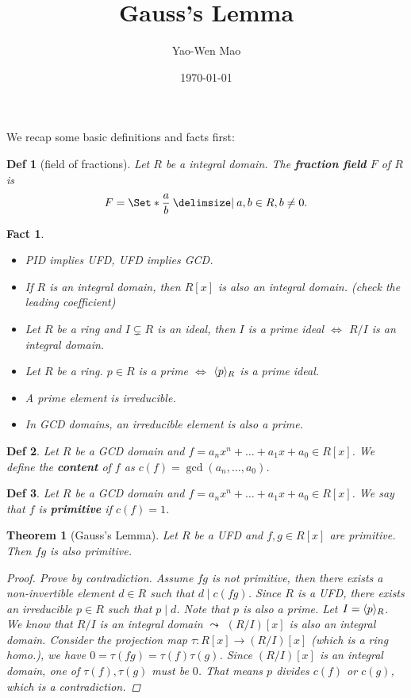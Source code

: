 \documentclass[a4paper]{article}
\title{Gauss's Lemma}
\author{Yao-Wen Mao}
\date{\today}
\DeclarePairedDelimiter{\gen}{\langle}{\rangle} %
\newcommand*\quot[2]{{#1}/{#2}}
\providecommand\given{}
\newcommand*\SetSymbol[1][]{%
  \nonscript\:#1\vert
  \allowbreak
  \nonscript\:
\mathopen{}}
\renewcommand\given{\SetSymbol[\delimsize]}
\renewcommand\given{\SetSymbol[\delimsize]}
\theoremstyle{mystyle}
\newtheorem{theorem}{Theorem}
\newtheorem{definition}{Def}
\newtheorem{fact}{Fact}
\begin{document}
\maketitle
We recap some basic definitions and facts first:

\begin{definition}[field of fractions]
  Let $R$ be a integral domain. The {\bf fraction field} $F$ of $R$
  is \[ F = \Set*{\frac{a}{b} \given a, b \in R, b \ne 0}. \]
\end{definition}

\begin{fact} \mbox{}
  \begin{itemize}
    \item PID implies UFD, UFD implies GCD.
    \item If $R$ is an integral domain, then $R[x]$ is also an integral domain.
      (check the leading coefficient)
    \item Let $R$ be a ring and $I \subsetneq R$ is an ideal, then
      $I$ is a prime ideal $\iff$ $\quot{R}{I}$ is an integral domain.
    \item Let $R$ be a ring. $p \in R$ is a prime $\iff$
      $\gen{p}_R$ is a prime ideal.
    \item A prime element is irreducible.
    \item In GCD domains, an irreducible element is also a prime.
  \end{itemize}
\end{fact}

\begin{definition}
  Let $R$ be a GCD domain and $f = a_nx^n + \dots + a_1x + a_0 \in R[x]$.
  We define the {\bf content} of $f$ as $c(f) = \gcd(a_n, \dots, a_0)$.
\end{definition}

\begin{definition}
  Let $R$ be a GCD domain and $f = a_nx^n + \dots + a_1x + a_0 \in R[x]$.
  We say that $f$ is {\bf primitive} if $c(f) = 1$.
\end{definition}

\begin{theorem}[Gauss's Lemma]
  Let $R$ be a UFD and $f, g \in R[x]$ are primitive. Then $fg$
  is also primitive.
  \begin{proof}
    Prove by contradiction. Assume $fg$ is not primitive, then there
    exists a non-invertible element $d \in R$ such that $d \mid c(fg)$.
    Since $R$ is a UFD, there exists an irreducible $p \in R$
    such that $p \mid d$. Note that $p$ is also a prime. Let $I = \gen{p}_R$.
    We know that $\quot{R}{I}$ is an integral domain $\leadsto$
    $(\quot{R}{I})[x]$ is also an integral domain.
    Consider the projection map $\tau: R[x] \to (\quot{R}{I})[x]$ (which is
    a ring homo.), we have $0 = \tau(fg) = \tau(f)\tau(g)$. Since
    $(\quot{R}{I})[x]$ is an integral domain, one of $\tau(f), \tau(g)$ must
    be $0$. That means $p$ divides $c(f)$ or $c(g)$, which is a contradiction.
  \end{proof}
\end{theorem}
\end{document}
